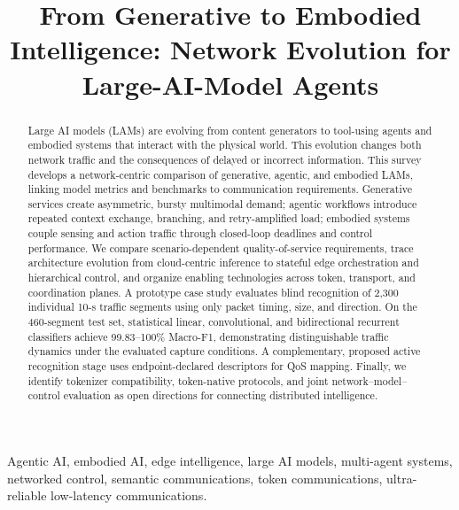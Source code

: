 \documentclass[letterpaper,journal]{IEEEtran}
\begin{document}
\title{\fontsize{24}{28}\selectfont From Generative to Embodied Intelligence: Network Evolution for Large-AI-Model Agents}

\author{}

\pagestyle{plain}

\maketitle
\thispagestyle{plain}

\begin{abstract}
Large AI models (LAMs) are evolving from content generators to tool-using
agents and embodied systems that interact with the physical world. This
evolution changes both network traffic and the consequences of delayed or
incorrect information. This survey develops a network-centric comparison of
generative, agentic, and embodied LAMs, linking model metrics and benchmarks
to communication requirements. Generative services create asymmetric,
bursty multimodal demand; agentic workflows introduce repeated context
exchange, branching, and retry-amplified load; embodied systems couple
sensing and action traffic through closed-loop deadlines and control
performance. We compare scenario-dependent quality-of-service requirements,
trace architecture evolution from cloud-centric inference to stateful edge
orchestration and hierarchical control, and organize enabling technologies
across token, transport, and coordination planes. A prototype case study
evaluates blind recognition of 2,300 individual 10-s traffic segments using
only packet timing, size, and direction. On the 460-segment test set,
statistical linear, convolutional, and bidirectional recurrent classifiers
achieve 99.83--100\% Macro-F1, demonstrating distinguishable traffic dynamics
under the evaluated capture conditions. A complementary, proposed active
recognition stage uses endpoint-declared descriptors for QoS mapping.
Finally, we identify tokenizer compatibility, token-native protocols, and
joint network--model--control evaluation as open directions for connecting
distributed intelligence.
\end{abstract}

\begin{IEEEkeywords}
Agentic AI, embodied AI, edge intelligence, large AI models, multi-agent
systems, networked control, semantic communications, token communications,
ultra-reliable low-latency communications.
\end{IEEEkeywords}
\end{document}
